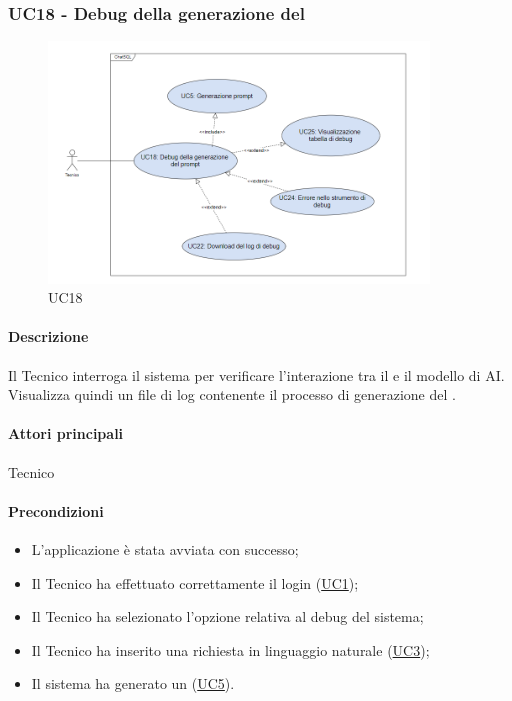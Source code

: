 \subsubsection{UC18 - Debug della generazione del }\label{UC18}

\begin{figure}[H]
  \centering
  \includegraphics[width=0.90\textwidth]{assets/uc18.png}
  \caption{UC18}
\end{figure}

\paragraph*{Descrizione}
Il Tecnico interroga il sistema per verificare l'interazione tra il  e il modello di AI. Visualizza quindi un file di log contenente il processo di generazione del .

\paragraph*{Attori principali}
Tecnico

\paragraph*{Precondizioni}
\begin{itemize}
  \item L'applicazione è stata avviata con successo;
  \item Il Tecnico ha effettuato correttamente il login (\hyperref[UC1]{UC1});
  \item Il Tecnico ha selezionato l'opzione relativa al debug del sistema;
  \item Il Tecnico ha inserito una richiesta in linguaggio naturale (\hyperref[UC3]{UC3});
  \item Il sistema ha generato un  (\hyperref[UC5]{UC5}).
\end{itemize}

